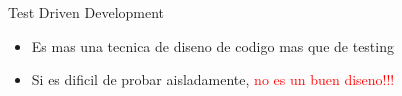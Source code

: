 
\begin{frame}{Test Driven Development} 
    \begin{itemize}
        \item Es mas una tecnica de diseno de codigo mas que de testing
        \item Si es dificil de probar aisladamente, \textcolor{red}{no es un buen diseno!!!}
    \end{itemize}
\end{frame}




